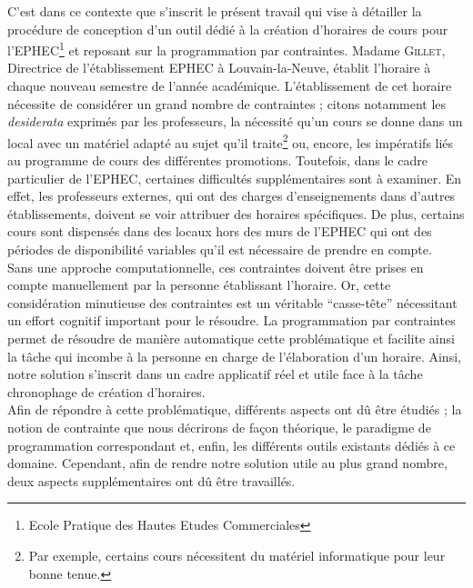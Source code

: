 \newline
\indent
C'est dans ce contexte que s'inscrit le présent travail qui vise à détailler la procédure de conception d'un outil dédié à la création d'horaires de cours pour l'EPHEC\footnote{Ecole Pratique des Hautes Etudes Commerciales} et reposant sur la programmation par contraintes.
\newline
\indent
Madame \textsc{Gillet}, Directrice de l'établissement EPHEC à Louvain-la-Neuve, établit l'horaire à chaque nouveau semestre de l'année académique. L'établissement de cet horaire nécessite de considérer un grand nombre de contraintes ; citons notamment les \textit{desiderata} exprimés par les professeurs, la nécessité qu'un cours se donne dans un local avec un matériel adapté au sujet qu'il traite\footnote{Par exemple, certains cours nécessitent du matériel informatique pour leur bonne tenue.} ou, encore, les impératifs liés au programme de cours des différentes promotions.
\newline
\indent
Toutefois, dans le cadre particulier de l'EPHEC, certaines difficultés supplémentaires sont à examiner. En effet, les professeurs externes, qui ont des charges d'enseignements dans d'autres établissements, doivent se voir attribuer des horaires spécifiques.  De plus, certains cours sont dispensés dans des locaux hors des murs de l'EPHEC qui ont des périodes de disponibilité variables qu'il est nécessaire de prendre en compte.\\
\newline
\indent
Sans une approche computationnelle, ces contraintes doivent être prises en compte manuellement par la personne établissant l'horaire. Or, cette considération minutieuse des contraintes est un véritable \enquote{casse-tête} nécessitant un effort cognitif important pour le résoudre. 
\newline
\indent
La programmation par contraintes permet de résoudre de manière automatique cette problématique et facilite ainsi la tâche qui incombe à la personne en charge de l'élaboration d'un horaire. Ainsi, notre solution s'inscrit dans un cadre applicatif réel et  utile face à la tâche chronophage de création d'horaires. \\
\newline
\indent
Afin de répondre à cette problématique, différents aspects ont dû être étudiés ; la notion de contrainte que nous décrirons de façon théorique, le paradigme de programmation correspondant et, enfin,  les différents outils existants dédiés à ce domaine. Cependant, afin de rendre notre solution utile au plus grand nombre, deux aspects supplémentaires ont dû être travaillés.
